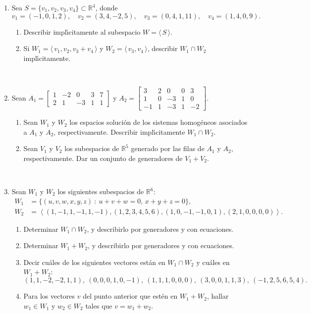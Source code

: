 \documentclass[12pt]{amsart}
\begin{document}
\begin{enumerate}[resume]
\

    \item Sea  $S=\{v_1,v_2,v_3,v_4\}\subset\mathbb R^4$, donde
$$v_1=(-1,0,1,2), \quad v_2=(3,4,-2,5), \quad v_3=(0,4,1,11), \quad v_4=(1,4,0,9).$$
\begin{enumerate}
	\item  Describir impl{\'\i}citamente al subespacio  $W= \langle \, S\, \rangle$.
	\item Si $W_1 = \langle \, v_1,v_2,v_3+v_4\, \rangle $ y $W_2 = \langle \, v_3,v_4\, \rangle $,
	describir $W_1\cap W_2$ impl{\'\i}citamente.
\end{enumerate}

\

\item\label{matrices} Sean
	$
	A_1=\begin{bmatrix}
	1&-2&0&3&7\\
	2&1&-3&1&1
	\end{bmatrix}$ y $A_2=\begin{bmatrix}
	3&2&0&0&3\\
	1&0&-3&1&0 \\
	-1&1&-3&1&-2
	\end{bmatrix}
	$.
	
	\begin{enumerate}
    \item Sean $W_1$ y $W_2$ los espacios soluci{\'o}n de los sistemas
	homog{\'e}neos asociados a $A_1$ y $A_2$, respectivamente.  Describir impl{\'\i}citamente $W_1\cap W_2$.
	\item Sean $V_1$ y $V_2$ los subespacios de $\mathbb{R}^5$ generado por las filas de $A_1$ y $A_2$, respectivamente. Dar un conjunto de generadores de $V_1+V_2$.
	\end{enumerate}

\

\item\label{todo} Sean $W_1$ y $W_2$ los siguientes subespacios de $\mathbb{R}^6$:
	\begin{align*}
	W_1 &= \{ (u,v,w,x,y,z)\ : \ u+v+w=0,\, x+y+z=0\},  \\
	W_2 &= \left\langle{(1,-1,1,-1,1,-1),(1,2,3,4,5,6),(1,0,-1,-1,0,1),(2,1,0,0,0,0)}\right\rangle.
	\end{align*}
	\begin{enumerate}
		\item  Determinar $W_1 \cap W_2$, y describirlo por generadores y con ecuaciones.
		\item  Determinar $W_1+W_2$, y describirlo por generadores y con ecuaciones.
		\item  Decir cu\'ales de los siguientes vectores est\'an en $W_1\cap W_2$ y cu\'ales en $W_1+W_2$:
		\[ (1,1,-2,-2,1,1),\ (0,0,0,1,0,-1),\ (1,1,1,0,0,0),\ (3,0,0,1,1,3),\ (-1,2,5,6,5,4). \]
		\item Para los vectores $v$ del punto anterior que est\' en en $W_1+W_2$,  hallar $w_1\in W_1$ y $w_2\in W_2$ tales que $v=w_1+w_2$.


\end{enumerate}
\end{enumerate}
\end{document}

